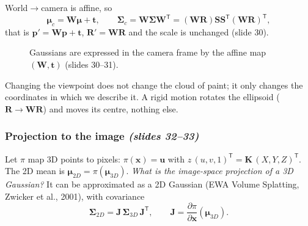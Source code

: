 \documentclass[11pt,a4paper]{article}
\newcommand{\T}{^{\mathsf T}}
\newcommand{\sr}[1]{\texorpdfstring{\emph{(#1)}}{(#1)}}
\theoremstyle{definition}
\theoremstyle{algstyle}
\theoremstyle{plain}
\theoremstyle{remark}
\newcommand{\blob}[6]{\begin{scope}[shift={(#1,#2)},rotate=#5]
  \shade[inner color=#6,outer color=#6!4] (0,0) ellipse (#3 and #4);\end{scope}}
\begin{document}
World$\to$camera is affine, so
\[
\bm\mu_c=\bm W\bm\mu+\bm t,\qquad\bm\Sigma_c=\bm W\bm\Sigma\bm W\T=(\bm W\bm R)\bm S\bm S\T(\bm W\bm R)\T,
\]
that is $\bm p'=\bm W\bm p+\bm t$, $\bm R'=\bm W\bm R$ and the scale is unchanged (slide 30).

\begin{figure}[htbp]
\centering
{}
\caption{Gaussians are expressed in the camera frame by the affine map $(\bm W,\bm t)$ (slides 30--31).}
\end{figure}

\begin{intuition}
Changing the viewpoint does not change the cloud of paint; it only changes the coordinates in which we describe it. A rigid motion rotates the ellipsoid ($\bm R\to\bm W\bm R$) and moves its centre, nothing else.
\end{intuition}

\subsubsection{Projection to the image \sr{slides 32--33}}
Let $\pi$ map 3D points to pixels: $\pi(\bm x)=\bm u$ with $z\,(u,v,1)\T=\bm K\,(X,Y,Z)\T$. The 2D mean is $\bm\mu_{2D}=\pi(\bm\mu_{3D})$. \emph{What is the image-space projection of a 3D Gaussian?} It can be approximated as a 2D Gaussian (EWA Volume Splatting, Zwicker et al., 2001), with covariance
\[
\bm\Sigma_{2D}=\bm J\,\bm\Sigma_{3D}\,\bm J\T,\qquad\bm J=\frac{\partial\pi}{\partial\bm x}(\bm\mu_{3D}).
\]
\end{document}
